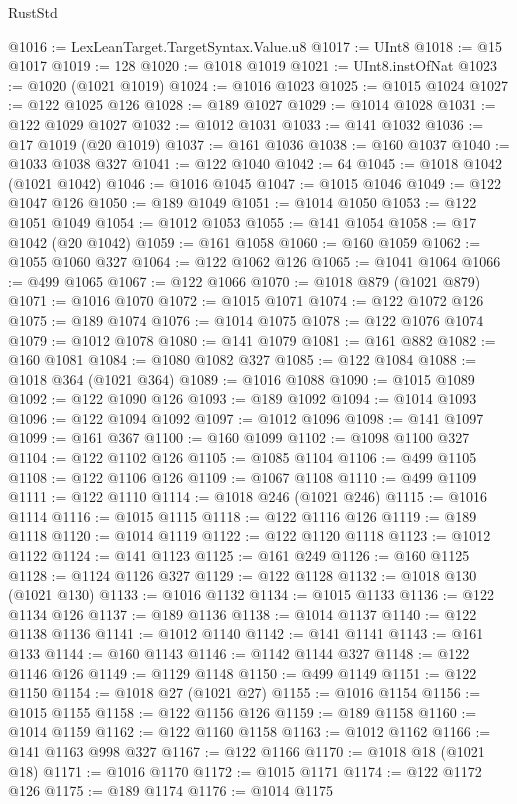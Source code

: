 \begin{lexlean}{RustStd}
\begin{coremodule}
{\begin{coremodule}
{{{{{{{{{{{{{{{{{{{{{{{{{{{{{{{{{{{{{{{{{{{{{{{{{{{{{{{{{{{{{{{{{{{{@1016 := LexLeanTarget.TargetSyntax.Value.u8
@1017 := UInt8
@1018 := @15 @1017
@1019 := 128
@1020 := @1018 @1019
@1021 := UInt8.instOfNat
@1023 := @1020 (@1021 @1019)
@1024 := @1016 @1023
@1025 := @1015 @1024
@1027 := @122 @1025 @126
@1028 := @189 @1027
@1029 := @1014 @1028
@1031 := @122 @1029 @1027
@1032 := @1012 @1031
@1033 := @141 @1032
@1036 := @17 @1019 (@20 @1019)
@1037 := @161 @1036
@1038 := @160 @1037
@1040 := @1033 @1038 @327
@1041 := @122 @1040
@1042 := 64
@1045 := @1018 @1042 (@1021 @1042)
@1046 := @1016 @1045
@1047 := @1015 @1046
@1049 := @122 @1047 @126
@1050 := @189 @1049
@1051 := @1014 @1050
@1053 := @122 @1051 @1049
@1054 := @1012 @1053
@1055 := @141 @1054
@1058 := @17 @1042 (@20 @1042)
@1059 := @161 @1058
@1060 := @160 @1059
@1062 := @1055 @1060 @327
@1064 := @122 @1062 @126
@1065 := @1041 @1064
@1066 := @499 @1065
@1067 := @122 @1066
@1070 := @1018 @879 (@1021 @879)
@1071 := @1016 @1070
@1072 := @1015 @1071
@1074 := @122 @1072 @126
@1075 := @189 @1074
@1076 := @1014 @1075
@1078 := @122 @1076 @1074
@1079 := @1012 @1078
@1080 := @141 @1079
@1081 := @161 @882
@1082 := @160 @1081
@1084 := @1080 @1082 @327
@1085 := @122 @1084
@1088 := @1018 @364 (@1021 @364)
@1089 := @1016 @1088
@1090 := @1015 @1089
@1092 := @122 @1090 @126
@1093 := @189 @1092
@1094 := @1014 @1093
@1096 := @122 @1094 @1092
@1097 := @1012 @1096
@1098 := @141 @1097
@1099 := @161 @367
@1100 := @160 @1099
@1102 := @1098 @1100 @327
@1104 := @122 @1102 @126
@1105 := @1085 @1104
@1106 := @499 @1105
@1108 := @122 @1106 @126
@1109 := @1067 @1108
@1110 := @499 @1109
@1111 := @122 @1110
@1114 := @1018 @246 (@1021 @246)
@1115 := @1016 @1114
@1116 := @1015 @1115
@1118 := @122 @1116 @126
@1119 := @189 @1118
@1120 := @1014 @1119
@1122 := @122 @1120 @1118
@1123 := @1012 @1122
@1124 := @141 @1123
@1125 := @161 @249
@1126 := @160 @1125
@1128 := @1124 @1126 @327
@1129 := @122 @1128
@1132 := @1018 @130 (@1021 @130)
@1133 := @1016 @1132
@1134 := @1015 @1133
@1136 := @122 @1134 @126
@1137 := @189 @1136
@1138 := @1014 @1137
@1140 := @122 @1138 @1136
@1141 := @1012 @1140
@1142 := @141 @1141
@1143 := @161 @133
@1144 := @160 @1143
@1146 := @1142 @1144 @327
@1148 := @122 @1146 @126
@1149 := @1129 @1148
@1150 := @499 @1149
@1151 := @122 @1150
@1154 := @1018 @27 (@1021 @27)
@1155 := @1016 @1154
@1156 := @1015 @1155
@1158 := @122 @1156 @126
@1159 := @189 @1158
@1160 := @1014 @1159
@1162 := @122 @1160 @1158
@1163 := @1012 @1162
@1166 := @141 @1163 @998 @327
@1167 := @122 @1166
@1170 := @1018 @18 (@1021 @18)
@1171 := @1016 @1170
@1172 := @1015 @1171
@1174 := @122 @1172 @126
@1175 := @189 @1174
@1176 := @1014 @1175
}}}}}}}}}}}}}}}}}}}}}}}}}}}}}}}}}}}}}}}}}}}}}}}}}}}}}}}}}}}}}}}}}}}}
\end{coremodule}}
\end{coremodule}
\end{lexlean}
